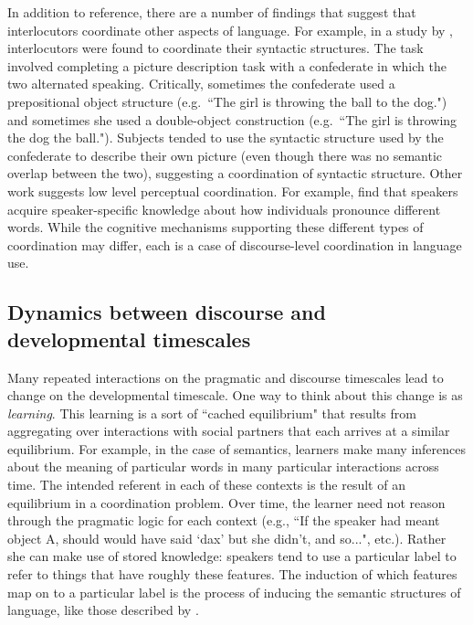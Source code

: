 \documentclass[man, noapacite, 12pt]{apa2}
\begin{document}
In addition to reference, there are a number of findings that suggest that interlocutors coordinate other aspects of language.  For example, in a study by , interlocutors were found to coordinate their syntactic structures. The task involved completing a picture description task with a confederate in which the two alternated speaking. Critically,  sometimes the confederate used a prepositional object structure (e.g.\ ``The girl is throwing the ball to the dog.") and sometimes she used a double-object construction (e.g.\ ``The girl is throwing the dog the ball.").  Subjects tended to use the syntactic structure used by the confederate to describe their own picture (even though there was no semantic overlap between the two), suggesting a coordination of syntactic structure. Other work suggests low level perceptual coordination. For example,   find that speakers acquire speaker-specific knowledge about how individuals pronounce different words. While the cognitive mechanisms supporting these different types of coordination may differ,  each is a case of discourse-level coordination in language use. 

\subsection{Dynamics between discourse and developmental timescales} 
Many repeated interactions on the pragmatic and discourse timescales lead to change on the developmental timescale. One way to think about this change is as {\it learning}. This learning is a sort of ``cached equilibrium" that results from aggregating over interactions with social partners that each arrives at a similar equilibrium. For example, in the case of semantics, learners make many inferences about the meaning of particular words in many particular interactions across time. The intended referent in each of these contexts is the result of an equilibrium in a coordination problem. Over time, the learner need not reason through the pragmatic logic for each context (e.g., ``If the speaker had meant object A, should would have said `dax' but she didn't, and so...", etc.). Rather she can make use of stored knowledge: speakers tend to use a particular label to refer to things that  have roughly these features. The induction of which features map on to a particular label is the process of inducing the semantic structures of language, like those described by .
\end{document}
